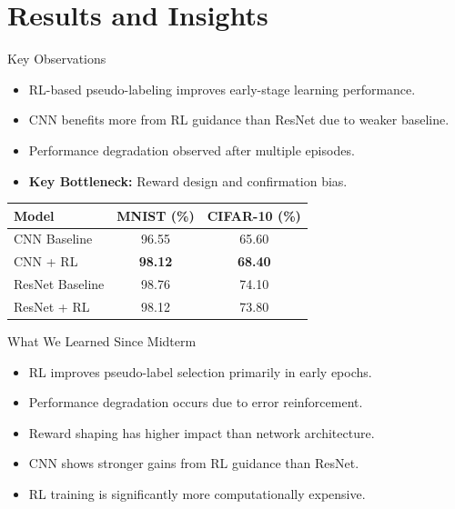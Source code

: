 \documentclass{beamer}
\begin{document}
\section{Results and Insights}
\begin{frame}{Key Observations}
  \begin{itemize}
    \item RL-based pseudo-labeling improves early-stage learning performance.
    \item CNN benefits more from RL guidance than ResNet due to weaker baseline.
    \item Performance degradation observed after multiple episodes.
    \item \textbf{Key Bottleneck:} Reward design and confirmation bias.
  \end{itemize}

  \vspace{0.3cm}
  \renewcommand{\arraystretch}{1.3}
  \centering
  \begin{tabular}{lcc}
    \toprule
    \textbf{Model} & \textbf{MNIST (\%)} & \textbf{CIFAR-10 (\%)} \\
    \midrule
    CNN Baseline & 96.55 & 65.60 \\
    CNN + RL & \textbf{98.12} & \textbf{68.40} \\
    ResNet Baseline & 98.76 & 74.10 \\
    ResNet + RL & 98.12 & 73.80 \\
    \bottomrule
  \end{tabular}

  \vspace{0.2cm}
\end{frame}


\begin{frame}{What We Learned Since Midterm}
  \begin{itemize}
    \item RL improves pseudo-label selection primarily in early epochs.
    \item Performance degradation occurs due to error reinforcement.
    \item Reward shaping has higher impact than network architecture.
    \item CNN shows stronger gains from RL guidance than ResNet.
    \item RL training is significantly more computationally expensive.
  \end{itemize}
\end{frame}
\end{document}

